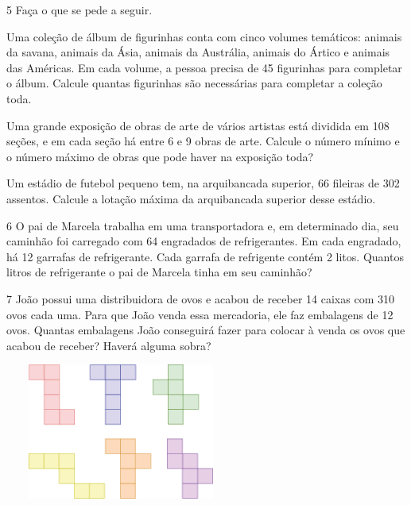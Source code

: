 \num{5} Faça o que se pede a seguir.

\begin{escolha}
\item Uma coleção de álbum de figurinhas conta com cinco volumes temáticos: animais da savana, animais da Ásia, animais da Austrália, animais do Ártico e animais das Américas. Em cada volume, a pessoa precisa de 45 figurinhas para completar o álbum. Calcule quantas figurinhas são necessárias para completar a coleção toda.

\item Uma grande exposição de obras de arte de vários artistas está dividida em 108 seções, e em cada seção há entre 6 e 9 obras de arte. Calcule o número mínimo e o número máximo de obras que pode haver na exposição toda?

\item Um estádio de futebol pequeno tem, na arquibancada superior, 66 fileiras de 302 assentos. Calcule a lotação máxima da arquibancada superior desse estádio.
\end{escolha}

\num{6} O pai de Marcela trabalha em uma transportadora e, em determinado
dia, seu caminhão foi carregado com 64 engradados de refrigerantes.
Em cada engradado, há 12 garrafas de refrigerante. Cada garrafa de refrigente
contém 2 litos. Quantos litros de
refrigerante o pai de Marcela tinha em seu caminhão?

\begin{mdframed}[linewidth=2pt,linecolor=salmao,roundcorner=2pt]
\vspace{2cm}
\end{mdframed}

\num{7} João
possui uma distribuidora de ovos e acabou de receber 14 caixas com 310
ovos cada uma. Para que João venda essa mercadoria, ele faz embalagens
de 12 ovos. Quantas embalagens João conseguirá fazer para
colocar à venda os ovos que acabou de receber? Haverá alguma sobra?

\includegraphics[width=3.00278in,height=1.75833in]{media/image36.png}


